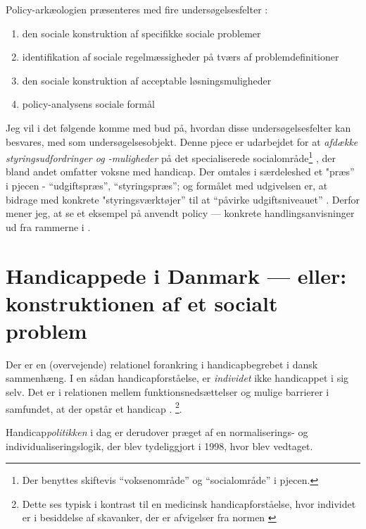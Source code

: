 Policy-arkæologien præsenteres med fire undersøgelsesfelter \autocite[s. 300]{scheurichPolicyArchaeologyNew1994}:
\begin{enumerate}
  \item
    den sociale konstruktion af specifikke sociale problemer
  \item
    identifikation af sociale regelmæssigheder på tværs af problemdefinitioner
  \item
    den sociale konstruktion af acceptable løsningsmuligheder
  \item
    policy-analysens sociale formål
\end{enumerate}

Jeg vil i det følgende komme med bud på, hvordan disse undersøgelsesfelter kan besvares, med  som undersøgelsesobjekt.
Denne pjece er udarbejdet for at \textit{afdække styringsudfordringer og -muligheder} på det specialiserede socialområde\footnote{Der benyttes skiftevis “voksenområde” og “socialområde” i pjecen.} \autocite[s. 2]{klStyringAfDet2017}, der bland andet omfatter voksne med handicap.
Der omtales i særdeleshed et "præs” i pjecen - “udgiftspræs”, “styringspræs”; og formålet med udgivelsen er, at bidrage med konkrete "styringsværktøjer” til at “påvirke udgiftsniveauet” \autocite[s. 2, 3. m.fl.]{klStyringAfDet2017}.
Derfor mener jeg, at se et eksempel på anvendt policy — konkrete handlingsanvisninger ud fra rammerne i .

\section{Handicappede i Danmark — eller: konstruktionen af et socialt problem}
Der er en (overvejende) relationel forankring i handicapbegrebet i dansk sammenhæng.
I en sådan handicapforståelse, er \textit{individet} ikke handicappet i sig selv. Det er i relationen mellem funktionsnedsættelser og mulige barrierer i samfundet,  at der opstår et handicap \autocite[s. 41]{alma99122456944705763}.
\footnote{Dette ses typisk i kontrast til en medicinsk handicapforståelse, hvor individet er i besiddelse af skavanker, der er afvigelser fra normen \autocite[s. 37]{alma99122456944705763}}.

Handicap\textit{politikken} i dag er derudover præget af en normaliserings- og individualiseringslogik, der blev tydeliggjort i 1998, hvor  blev vedtaget.

